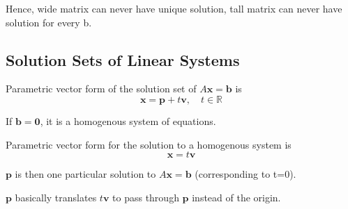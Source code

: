 \documentclass[../linear-algebra.tex]{subfiles}
\begin{document}
\medskip
\noindent Hence, wide matrix can never have unique solution,
tall matrix can never have solution for every b.

\subsection{Solution Sets of Linear Systems}
Parametric vector form of the solution set of $A\mathbf{x}=\mathbf{b}$ is
\[\mathbf{x} = \mathbf{p} + t\mathbf{v},\quad t\in\mathbb{R}\]

\noindent If $\mathbf{b}=\mathbf{0}$, it is a homogenous system of equations.

\noindent Parametric vector form for the solution to a homogenous system is
\[\mathbf{x} = t\mathbf{v}\]

\noindent $\mathbf{p}$ is then one particular solution to $A\mathbf{x}=\mathbf{b}$
(corresponding to t=0).

\noindent $\mathbf{p}$ basically translates $t\mathbf{v}$ to pass through $\mathbf{p}$ instead of the origin.    
\end{document}
